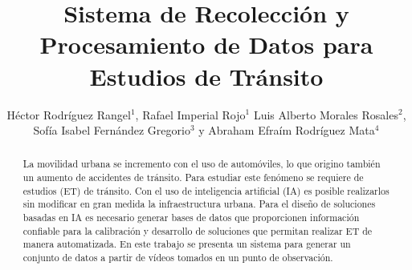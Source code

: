 \documentclass{llncs}
\begin{document}
%
\title{Sistema de Recolección y Procesamiento de Datos para Estudios de Tránsito}
%
%
 \author{Héctor Rodríguez Rangel$^{1}$,
 Rafael Imperial Rojo$^{1}$ Luis Alberto Morales Rosales$^{2}$, Sofía Isabel Fernández Gregorio$^{3}$ y Abraham Efraím Rodríguez Mata$^{4}$}
\maketitle              %
%
\begin{abstract}
La movilidad urbana se incremento con el uso de automóviles, lo que origino también un aumento de accidentes de tránsito. Para estudiar este fenómeno se requiere de estudios (ET) de tránsito. Con el uso de inteligencia artificial (IA) es posible realizarlos sin modificar en gran medida la infraestructura urbana. Para el diseño de soluciones basadas en IA es necesario generar bases de datos que proporcionen información confiable para la calibración y desarrollo de soluciones que permitan realizar ET de manera automatizada. En este trabajo se presenta un sistema para generar un conjunto de datos a partir de vídeos tomados en un punto de observación. 

\end{abstract}
%
%
%
\end{document}
